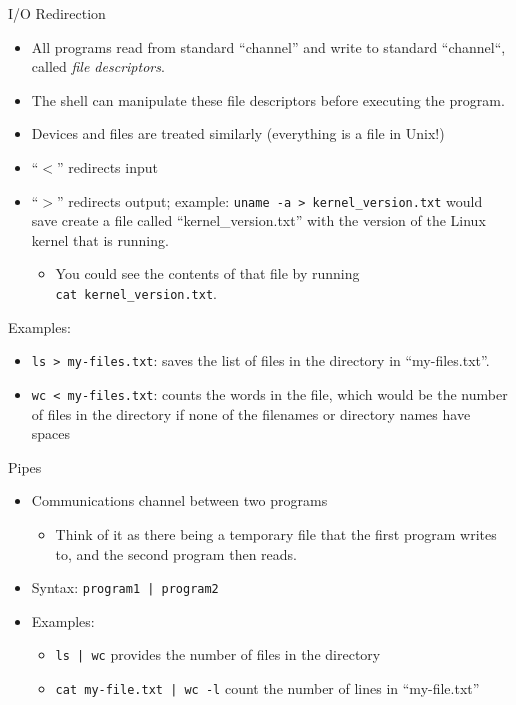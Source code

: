\documentclass[graphics]{beamer}
\begin{document}
\begin{frame}{I/O Redirection}
     {
        \begin{itemize}
            \item All programs read from standard ``channel'' and write to standard ``channel``, called \textit{file descriptors}.
            \item The shell can manipulate these file descriptors before executing the program.
            \item Devices and files are treated similarly (everything is a file in Unix!)
            \item ``$<$'' redirects input
            \item ``$>$'' redirects output; example: \texttt{uname -a > kernel\_version.txt} would save create a file called ``kernel\_version.txt'' with the version of the Linux kernel that is running.
            \begin{itemize}
                \item You could see the contents of that file by running \\ \texttt{cat kernel\_version.txt}.
            \end{itemize}
        \end{itemize}
    }
     {
        Examples:
        \begin{itemize}
            \item \texttt{ls > my-files.txt}: saves the list of files in the directory in ``my-files.txt''.
            \item \texttt{wc < my-files.txt}: counts the words in the file, which would be the number of files in the directory if none of the filenames or directory names have spaces
        \end{itemize}
    }
\end{frame}

\begin{frame}{Pipes}
    \begin{itemize}
        \item Communications channel between two programs
        \begin{itemize}
            \item Think of it as there being a temporary file that the first program writes to, and the second program then reads.
        \end{itemize}
        \item Syntax: \texttt{program1 | program2}
        \item Examples:
        \begin{itemize}
            \item \texttt{ls | wc} provides the number of files in the directory
            \item \texttt{cat my-file.txt | wc -l} count the number of lines in ``my-file.txt''
        \end{itemize}
    \end{itemize}
\end{frame}
\end{document}
